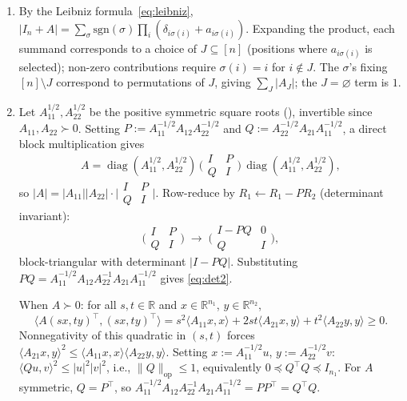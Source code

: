 \documentclass[12pt,a4paper]{article}
\makeatletter
\theoremstyle{definition}
\renewenvironment{proof}[1][\proofname]{\par
  \pushQED{\qed}%
  \normalfont \topsep6\p@\@plus6\p@\relax
  \trivlist
  \item[\hskip\labelsep\bfseries #1\@addpunct{.}]\ignorespaces
}{%
  \popQED\endtrivlist\@endpefalse
}
\newcommand{\R}{\mathbb{R}}
\newcommand{\diag}{\operatorname{diag}}
\makeatother
\begin{document}
\begin{proof}
  \leavevmode
  \begin{enumerate}[label=(\roman*)]
    \item By the Leibniz formula~\eqref{eq:leibniz},
      $|I_n+A|=\sum_\sigma\mathrm{sgn}(\sigma)\prod_i
      (\delta_{i\sigma(i)}+a_{i\sigma(i)})$.  Expanding the product, each
      summand corresponds to a choice of $J\subseteq[n]$ (positions where
      $a_{i\sigma(i)}$ is selected); non-zero contributions require
      $\sigma(i)=i$ for $i\notin J$.  The $\sigma$'s fixing $[n]\setminus J$
      correspond to permutations of $J$, giving $\sum_J|A_J|$; the $J=\varnothing$
      term is $1$.

    \item Let $A_{11}^{1/2},A_{22}^{1/2}$ be the positive
      symmetric square roots (), invertible since
      $A_{11},A_{22}\succ 0$.
      Setting $P:=A_{11}^{-1/2}A_{12}A_{22}^{-1/2}$ and
      $Q:=A_{22}^{-1/2}A_{21}A_{11}^{-1/2}$, a direct block multiplication
      gives
      \[
        A=\diag(A_{11}^{1/2},A_{22}^{1/2})\,
        \bigl(\begin{smallmatrix}I&P\\Q&I\end{smallmatrix}\bigr)\,
        \diag(A_{11}^{1/2},A_{22}^{1/2}),
      \]
      so $|A|=|A_{11}||A_{22}|\cdot\bigl|
      \begin{smallmatrix}I&P\\Q&I\end{smallmatrix}\bigr|$.
      Row-reduce by $R_1\leftarrow R_1-PR_2$ (determinant invariant):
      \[
        \bigl(\begin{smallmatrix}I&P\\Q&I\end{smallmatrix}\bigr)
        \;\to\;
        \bigl(\begin{smallmatrix}I-PQ&0\\Q&I\end{smallmatrix}\bigr),
      \]
      block-triangular with determinant $|I-PQ|$.  Substituting
      $PQ=A_{11}^{-1/2}A_{12}A_{22}^{-1}A_{21}A_{11}^{-1/2}$ gives
      \eqref{eq:det2}.

      When $A\succ 0$: for all $s,t\in\R$ and $x\in\R^{n_1}$,
      $y\in\R^{n_2}$,
      \[
        \langle A(sx,ty)^\top,(sx,ty)^\top\rangle
        =s^2\langle A_{11}x,x\rangle+2st\langle A_{21}x,y\rangle
        +t^2\langle A_{22}y,y\rangle\geqslant 0.
      \]
      Nonnegativity of this quadratic in $(s,t)$ forces
      $\langle A_{21}x,y\rangle^2\leqslant\langle A_{11}x,x\rangle
      \langle A_{22}y,y\rangle$.
      Setting $x:=A_{11}^{-1/2}u$, $y:=A_{22}^{-1/2}v$:
      $\langle Qu,v\rangle^2\leqslant|u|^2|v|^2$, i.e.,
      $\|Q\|_{\mathrm{op}}\leqslant 1$, equivalently
      $0\preccurlyeq Q^\top Q\preccurlyeq I_{n_1}$.  For $A$ symmetric, $Q=P^\top$, so
      $A_{11}^{-1/2}A_{12}A_{22}^{-1}A_{21}A_{11}^{-1/2}=PP^\top=Q^\top Q$.
  \end{enumerate}
\end{proof}
\end{document}
